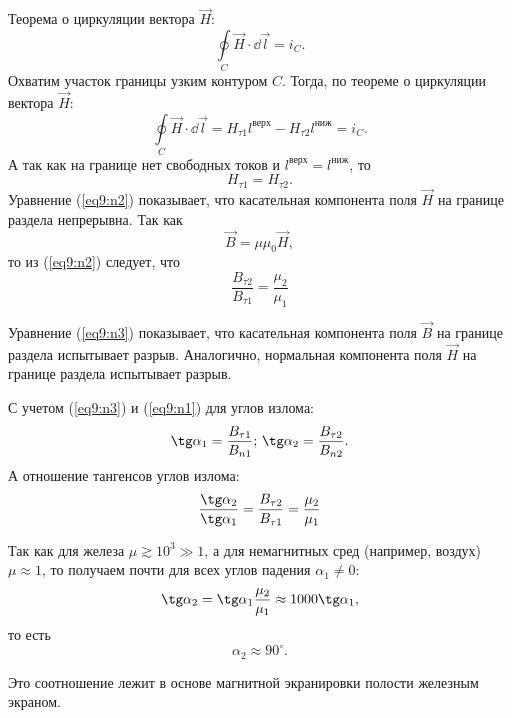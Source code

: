     Теорема о циркуляции вектора \( \vec{H} \):
    \[
        \oint\limits_C \vec{H}\cdot\dd\vec{l} = i_C.
    \]
    Охватим участок границы узким контуром \( C \). Тогда, по теореме о 
    циркуляции вектора \( \vec{H} \):
    \[
        \oint\limits_C \vec{H}\cdot\dd\vec{l} = H_{\tau 1}l^{\text{верх}} -
        H_{\tau 2}l^{\text{ниж}} = i_C.
    \]
    А так как на границе нет свободных токов и \( l^\text{верх}=l^\text{ниж} \),
    то
    \begin{equation}
        H_{\tau 1} = H_{\tau 2}.
        \label{eq9:n2}
    \end{equation}
    Уравнение (\ref{eq9:n2}) показывает, что касательная компонента поля
    \( \vec{H} \) на границе раздела непрерывна. Так как
    \[
        \vec{B} = \mu\mu_0\vec{H},
    \]
    то из (\ref{eq9:n2}) следует, что
    \begin{equation}
        \frac{B_{\tau 2}}{B_{\tau 1}} = \frac{\mu_2}{\mu_1}
        \label{eq9:n3}
    \end{equation}

    Уравнение (\ref{eq9:n3}) показывает, что касательная компонента поля
    \( \vec{B} \) на границе раздела испытывает разрыв. Аналогично, нормальная
    компонента поля \( \vec{H} \) на границе раздела испытывает разрыв.

    С учетом (\ref{eq9:n3}) и (\ref{eq9:n1}) для углов излома:
    \[
        \tg\alpha_1 = \frac{B_{\tau 1}}{B_{n1}}; \,
        \tg\alpha_2 = \frac{B_{\tau 2}}{B_{n2}}.
    \]
    А отношение тангенсов углов излома:
    \begin{equation}
        \frac{\tg\alpha_2}{\tg\alpha_1} = \frac{B_{\tau 2}}{B_{\tau 1}} =
        \frac{\mu_2}{\mu_1}
        \label{eq9:n4}
    \end{equation}

    Так как для железа \( \mu \gtrsim 10^3 \gg 1 \), а для немагнитных сред
    (например, воздух) \( \mu \approx 1 \), то получаем почти для всех углов
    падения \( \alpha_1 \ne 0 \):
    \[
        \tg\alpha_2 = \tg\alpha_1\frac{\mu_2}{\mu_1} \approx 1000\tg\alpha_1,
    \]
    то есть
    \[
        \alpha_2 \approx 90^\circ.
    \]

    Это соотношение лежит в основе магнитной экранировки полости железным
    экраном.
